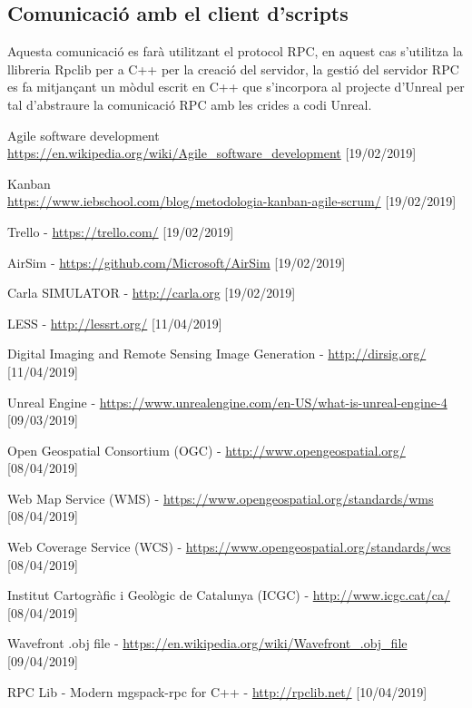 \documentclass[10pt,a4paper]{article}
\begin{document}
\subsection{Comunicació amb el client d'scripts}

Aquesta comunicació es farà utilitzant el protocol RPC, en aquest cas s'utilitza la llibreria Rpclib\cite{rpclib} per a C++ per la creació del servidor, la gestió del servidor RPC es fa mitjançant un mòdul escrit en C++ que s'incorpora al projecte d'Unreal per tal d'abstraure la comunicació RPC amb les crides a codi Unreal.

\begin{thebibliography}{11}
Agile software development
\\ \url{https://en.wikipedia.org/wiki/Agile_software_development}
[19/02/2019]

Kanban
\\ \url{https://www.iebschool.com/blog/metodologia-kanban-agile-scrum/} [19/02/2019]

Trello - \url{https://trello.com/} [19/02/2019]

AirSim - \url{https://github.com/Microsoft/AirSim} [19/02/2019]

Carla SIMULATOR - \url{http://carla.org} [19/02/2019]

LESS - \url{http://lessrt.org/} [11/04/2019]

Digital Imaging and Remote Sensing Image Generation - \url{http://dirsig.org/} [11/04/2019]

Unreal Engine - \url{https://www.unrealengine.com/en-US/what-is-unreal-engine-4} [09/03/2019]

Open Geospatial Consortium (OGC) -  \url{http://www.opengeospatial.org/} [08/04/2019]

Web Map Service (WMS) -  \url{https://www.opengeospatial.org/standards/wms} [08/04/2019]

Web Coverage Service (WCS) -  \url{https://www.opengeospatial.org/standards/wcs} [08/04/2019]

Institut Cartogràfic i Geològic de Catalunya (ICGC) - \url{http://www.icgc.cat/ca/} [08/04/2019]

Wavefront .obj file - \url{https://en.wikipedia.org/wiki/Wavefront_.obj_file} [09/04/2019]

RPC Lib - Modern mgspack-rpc for C++ - \url{http://rpclib.net/} [10/04/2019]


\end{thebibliography}
\end{document}
